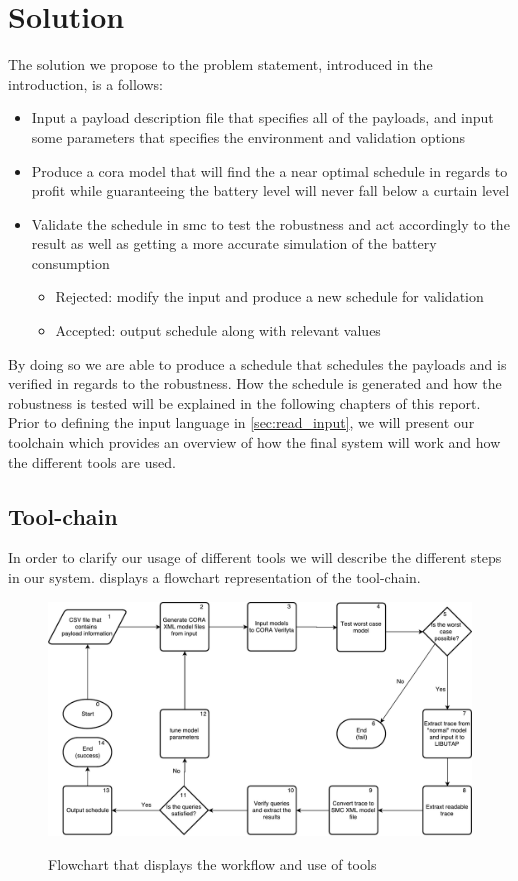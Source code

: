 \section{Solution} \label{sec:solution}
The solution we propose to the problem statement, introduced in the introduction, is a follows:
\begin{itemize}
	\item	Input a payload description file that specifies all of the payloads, and input some parameters that specifies the environment and validation options
	\item	Produce a \gls{cora} model that will find the a near optimal schedule in regards to profit while guaranteeing the battery level will never fall below a curtain level
	\item	Validate the schedule in \gls{smc} to test the robustness and act accordingly to the result as well as getting a more accurate simulation of the battery consumption
	\begin{itemize}
		\item	Rejected: modify the input and produce a new schedule for validation
		\item	Accepted: output schedule along with relevant values
	\end{itemize}
\end{itemize}

By doing so we are able to produce a schedule that schedules the payloads and is verified in regards to the robustness.
How the schedule is generated and how the robustness is tested will be explained in the following chapters of this report.
Prior to defining the input language in \cref{sec:read_input}, we will present our toolchain which provides an overview of how the final system will work and how the different tools are used.

\subsection{Tool-chain} \label{subsec:tool_chainv}
In order to clarify our usage of different tools we will describe the different steps in our system. 
 displays a flowchart representation of the tool-chain.

\begin{figure}[h]
	\includegraphics[width=\textwidth]{graphics/tool_chain.pdf}
	\label{fig:tool1}
	\caption{Flowchart that displays the workflow and use of tools}
\end{figure}

